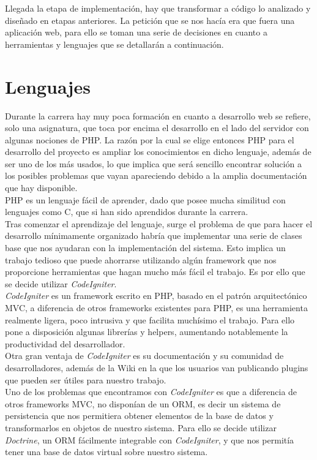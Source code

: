 Llegada la etapa de implementación, hay que transformar a código lo analizado y diseñado en etapas anteriores. La petición que se nos hacía era que fuera una aplicación web, para ello se toman una serie de decisiones en cuanto a herramientas y lenguajes que se detallarán a continuación.

\section{Lenguajes}

Durante la carrera hay muy poca formación en cuanto a desarrollo web se refiere, solo una asignatura, que toca por encima el desarrollo en el lado del servidor con algunas nociones de PHP. La razón por la cual se elige entonces PHP para el desarrollo del proyecto es ampliar los conocimientos en dicho lenguaje, además de ser uno de los más usados, lo que implica que será sencillo encontrar solución a los posibles problemas que vayan apareciendo debido a la amplia documentación que hay disponible.\\

PHP es un lenguaje fácil de aprender, dado que posee mucha similitud con lenguajes como C, que si han sido aprendidos durante la carrera.\\

Tras comenzar el aprendizaje del lenguaje, surge el problema de que para hacer el desarrollo mínimamente organizado habría que implementar una serie de clases base que nos ayudaran con la implementación del sistema. Esto implica un trabajo tedioso que puede ahorrarse utilizando algún framework que nos proporcione herramientas que hagan mucho más fácil el trabajo. Es por ello que se decide utilizar {\em CodeIgniter}.
\\

{\em CodeIgniter} es un framework escrito en PHP, basado en el patrón arquitectónico MVC, a diferencia de otros frameworks existentes para PHP, es una herramienta realmente ligera, poco intrusiva y que facilita muchísimo el trabajo. Para ello pone a disposición algunas librerías y helpers, aumentando notablemente la productividad del desarrollador. \\

Otra gran ventaja de {\em CodeIgniter} es su documentación y su comunidad de desarrolladores, además de la Wiki en la que los usuarios van publicando plugins que pueden ser útiles para nuestro trabajo.\\

Uno de los problemas que encontramos con {\em CodeIgniter} es que a diferencia de otros frameworks MVC, no disponían de un ORM, es decir un sistema de persistencia que nos permitiera obtener elementos de la base de datos y transformarlos en objetos de nuestro sistema. Para ello se decide utilizar {\em Doctrine}, un ORM fácilmente integrable con {\em CodeIgniter}, y que nos permitía tener una base de datos virtual sobre nuestro sistema.\\

